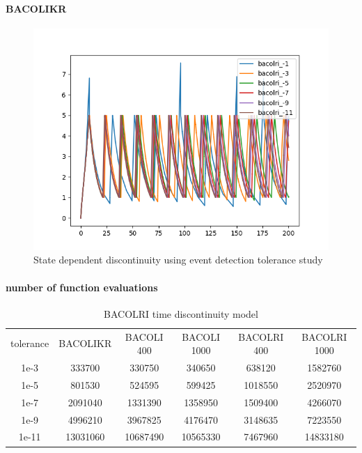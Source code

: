 \documentclass{article}
\begin{document}
\paragraph{BACOLIKR}
\begin{figure}[H]
\centering
\includegraphics[width=0.7\linewidth]{./figures/pde_state_disc_tol_event}
\caption{State dependent discontinuity using event detection tolerance study}
\label{fig:pde_state_disc_tol_event}
\end{figure}

\paragraph{number of function evaluations}

\begin{table}[h]
\caption {BACOLRI time discontinuity model} 
\label{tab:BACOLRI_time_tolerance}
\begin{center}
\begin{tabular}{ c c c c c c } 
tolerance  & BACOLIKR  & BACOLI 400   & BACOLI 1000 & BACOLRI 400 & BACOLRI 1000\\ 
1e-3       & 333700    &   330750     & 340650      & 638120      & 1582760   \\
1e-5       & 801530    &   524595     & 599425      & 1018550     & 2520970  \\
1e-7       & 2091040   &   1331390    & 1358950     & 1509400     & 4266070 \\
1e-9       & 4996210   &   3967825    & 4176470     & 3148635     & 7223550 \\
1e-11      & 13031060  &   10687490   & 10565330    & 7467960     & 14833180  \\
\end{tabular}
\end{center}
\end{table}
\end{document}
